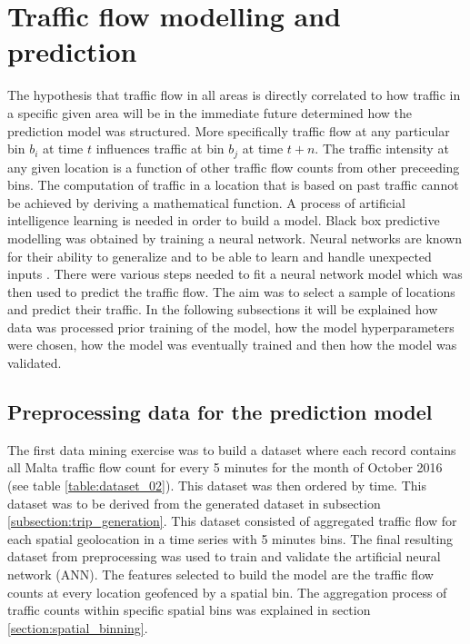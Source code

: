\documentclass[12pt, a4paper]{report}
\theoremstyle{definition}
\theoremstyle{definition}%
\theoremstyle{definition}%
\theoremstyle{definition}%
\theoremstyle{definition}%
\theoremstyle{definition}%
\begin{document}
\section{Traffic flow modelling and prediction} \label{section:traffic_flow_modelling_and_prediction}


The hypothesis that traffic flow in all areas is directly correlated to how traffic in a specific given area will be in the immediate future determined how the prediction model was structured. More specifically traffic flow at any particular bin $b_i$ at time $t$ influences traffic at bin $b_j$ at time $t + n$. The traffic intensity at any given location is a function of other traffic flow counts from other preceeding bins. The computation of traffic in a location that is based on past traffic cannot be achieved by deriving a mathematical function. A process of artificial intelligence learning is needed in order to build a model. Black box predictive modelling was obtained by training a neural network. Neural networks are known for their ability to generalize and to be able to learn and handle unexpected inputs \cite{sommer2013using}. There were various steps needed to fit a neural network model which was then used to predict the traffic flow. The aim was to select a sample of locations and predict their traffic. In the following subsections it will be explained how data was processed prior training of the model, how the model hyperparameters were chosen, how the model was eventually trained and then how the model was validated.



\subsection{Preprocessing data for the prediction model} \label{subsection:Preprocessing data for the prediction model}
The first data mining exercise was to build a dataset where each record contains all Malta traffic flow count for every 5 minutes for the month of October 2016 (see table \ref{table:dataset_02}). This dataset was then ordered by time. This dataset was to be derived from the generated dataset in subsection \ref{subsection:trip_generation}. This dataset consisted of aggregated traffic flow for each spatial geolocation in a time series with 5 minutes bins. The final resulting dataset from preprocessing was used to train and validate the artificial neural network (ANN). The features selected to build the model are the traffic flow counts at every location geofenced by a spatial bin. The aggregation process of traffic counts within specific spatial bins was explained in section \ref{section:spatial_binning}.
\end{document}
